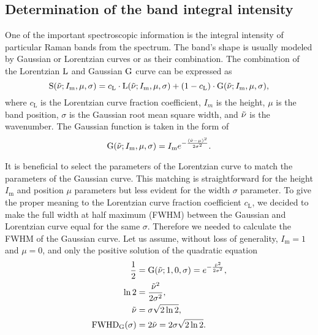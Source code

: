 \subsection{Determination of the band integral intensity}
\label{band_intensities}

One of the important spectroscopic information is the integral intensity of
particular Raman bands from the spectrum.
The band's shape is usually modeled by Gaussian or Lorentzian curves or as
their combination.
The combination of the Lorentzian $\operatorname{L}$ and Gaussian $\operatorname{G}$ curve can
be expressed as
\begin{equation}
	\func{S}(\wn; I_\text{m}, \mu, \sigma) =
		c_\text{L} \cdot \func{L}(\wn; I_\text{m}, \mu, \sigma)
		+ (1 - c_\text{L}) \cdot \func{G}(\wn; I_\text{m}, \mu, \sigma),
	\label{\eqnlabel{band_intensities:single_shape}}
\end{equation}
where $c_\text{L}$ is the Lorentzian curve fraction coefficient, $I_m$ is the
height, $\mu$ is the band position, $\sigma$ is the Gaussian root mean square
width, and $\tilde{\nu}$ is the wavenumber.
The Gaussian function is taken in the form of
\begin{equation*}
	\operatorname{G}(\tilde{\nu}; I_\text{m}, \mu, \sigma) =
		I_\text{m} e^{-\frac{(\tilde{\nu} - \mu)^2}{2\sigma^2}}.
\end{equation*}

It is beneficial to select the parameters of the Lorentzian curve to match the
parameters of the Gaussian curve.
This matching is straightforward for the height $I_\text{m}$ and position
$\mu$ parameters but less evident for the width $\sigma$ parameter.
To give the proper meaning to the Lorentzian curve fraction coefficient
$c_\text{L}$, we decided to make the full width at half maximum (FWHM) between
the Gaussian and Lorentzian curve equal for the same $\sigma$.
Therefore we needed to calculate the FWHM of the Gaussian curve.
Let us assume, without loss of generality,
$I_\text{m} = 1$
and
$\mu = 0$,
and only the positive solution of the quadratic equation
\begin{align}
	\frac{1}{2} &= \func{G}(\wn; 1, 0, \sigma)
		= e^{-\frac{\wn^2}{2\sigma^2}}, \nonumber \\
	\func{ln}2  &= \frac{\wn^2}{2\sigma^2}, \nonumber \\
	\wn         &= \sigma\sqrt{2\ln2},
		\label{\eqnlabel{band_intensities:HWHM}}\\
	\func{FWHD}_\text{G}(\sigma)
	            &= 2\wn = 2\sigma\sqrt{2\ln2}. \nonumber
\end{align}


